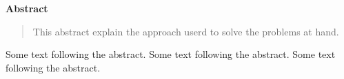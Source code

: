 \documentclass{article}
\newenvironment{Abstract}{
	\begin{center}\normalfont\bfseries Abstract\end{center}
	\begin{quote}\par
}%
{\end{quote}}%
\begin{document}
\begin{Abstract}
	This abstract explain the approach userd to solve the problems at hand.
\end{Abstract}
Some text following the abstract. Some text following the abstract. Some text following the abstract.
\end{document}
